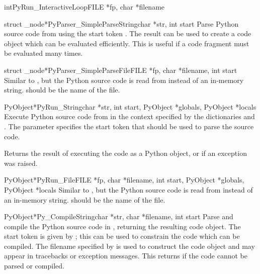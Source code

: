 \documentclass{manual}
\begin{document}
\begin{cfuncdesc}{int}{PyRun_InteractiveLoop}{FILE *fp, char *filename}
\end{cfuncdesc}

\begin{cfuncdesc}{struct _node*}{PyParser_SimpleParseString}{char *str,
                                                             int start}
  Parse Python source code from  using the start token
  .  The result can be used to create a code object which
  can be evaluated efficiently.  This is useful if a code fragment
  must be evaluated many times.
\end{cfuncdesc}

\begin{cfuncdesc}{struct _node*}{PyParser_SimpleParseFile}{FILE *fp,
                                 char *filename, int start}
  Similar to , but the Python
  source code is read from  instead of an in-memory string.
   should be the name of the file.
\end{cfuncdesc}

\begin{cfuncdesc}{PyObject*}{PyRun_String}{char *str, int start,
                                           PyObject *globals,
                                           PyObject *locals}
  Execute Python source code from  in the context specified
  by the dictionaries  and .  The parameter
   specifies the start token that should be used to parse
  the source code.

  Returns the result of executing the code as a Python object, or
  \NULL{} if an exception was raised.
\end{cfuncdesc}

\begin{cfuncdesc}{PyObject*}{PyRun_File}{FILE *fp, char *filename,
                                         int start, PyObject *globals,
                                         PyObject *locals}
  Similar to , but the Python source code is 
  read from  instead of an in-memory string.  
  should be the name of the file.
\end{cfuncdesc}

\begin{cfuncdesc}{PyObject*}{Py_CompileString}{char *str, char *filename,
                                               int start}
  Parse and compile the Python source code in , returning the 
  resulting code object.  The start token is given by ;
  this can be used to constrain the code which can be compiled.  The
  filename specified by  is used to construct the code
  object and may appear in tracebacks or 
  exception messages.  This returns \NULL{} if the code cannot be
  parsed or compiled.
\end{cfuncdesc}
\end{document}
